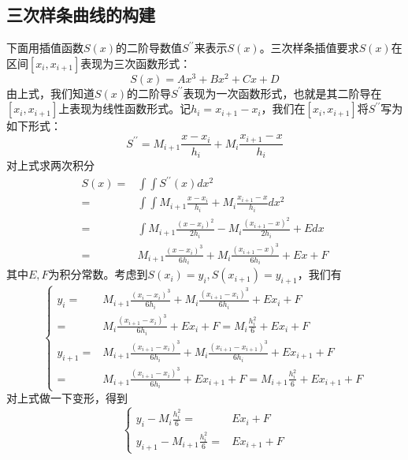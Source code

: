 	\subsection{三次样条曲线的构建}
	下面用插值函数$S(x)$的二阶导数值$S^{\prime\prime}$来表示$S(x)$。三次样条插值要求$S(x)$在区间$[x_i, x_{i+1}]$表现为三次函数形式：
	\begin{equation*}
		S(x) = Ax^3 + Bx^2 + Cx + D
	\end{equation*} 
	由上式，我们知道$S(x)$的二阶导$S^{\prime\prime}$表现为一次函数形式，也就是其二阶导在$[x_i, x_{i+1}]$上表现为线性函数形式。记$h_i = x_{i+1} - x_{i}$，我们在$[x_i, x_{i+1}]$将$S^{\prime\prime}$写为如下形式：
	\begin{equation}
		S^{\prime\prime} = M_{i+1} \frac{x - x_i}{h_i} + M_{i} \frac{x_{i+1} - x}{h_i}
	\end{equation} 
	对上式求两次积分
	\begin{equation*}
		\begin{aligned}
			S(x) =& \int\int S^{\prime\prime}(x) dx^2	\\
				 =&	\int\int M_{i+1} \frac{x - x_i}{h_i} + M_{i} \frac{x_{i+1} - x}{h_i} dx^2	\\
				 =&	\int M_{i+1} \frac{(x - x_i)^2}{2h_i} -  M_{i} \frac{(x_{i+1} - x)^2}{2h_i} + E dx	\\
				 =&	M_{i+1} \frac{(x - x_i)^3}{6h_i} +  M_{i} \frac{(x_{i+1} - x)^3}{6h_i} + Ex + F 
		\end{aligned}
	\end{equation*} 
	其中$E, F$为积分常数。考虑到$S(x_i) = y_i, S(x_{i+1}) = y_{i+1}$，我们有
	\begin{equation*}
		\left\{
			\begin{aligned}
				y_i =& M_{i+1} \frac{(x_{i} - x_i)^3}{6h_i} +  M_{i} \frac{(x_{i+1} - x_i)^3}{6h_i} + Ex_i + F  \\
					=& M_{i} \frac{(x_{i+1} - x_i)^3}{6h_i} + Ex_i + F = M_{i} \frac{h_i^2}{6} + Ex_i + F   \\ 
				y_{i+1} =& M_{i+1}\frac{(x_{i+1}-x_i)^3}{6h_i}+M_{i}\frac{(x_{i+1}-x_{i+1})^3}{6h_i}+Ex_{i+1}+F  \\
						=& M_{i+1} \frac{(x_{i+1} - x_i)^3}{6h_i} + Ex_{i+1} + F = M_{i+1} \frac{h_i^2}{6} + Ex_{i+1} + F   
			\end{aligned}
		\right.
	\end{equation*} 
	对上式做一下变形，得到
	\begin{equation*}
	    \left\{ 
			\begin{aligned}
				y_i - M_{i} \frac{h_i^2}{6} =&  Ex_i + F   \\ 
				y_{i+1} - M_{i+1} \frac{h_i^2}{6} = & Ex_{i+1} + F   
			\end{aligned}
		\right.
	\end{equation*} 
